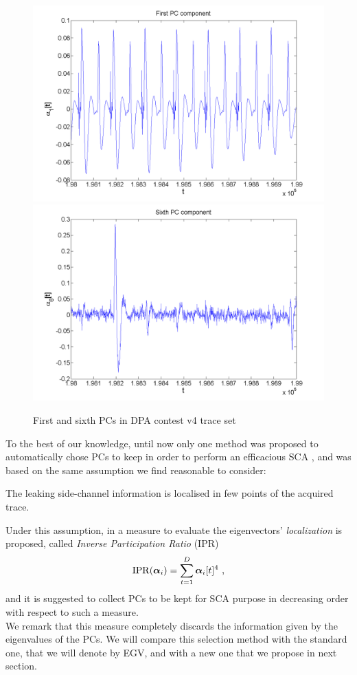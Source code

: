 \begin{figure}
\includegraphics[width=.5\textwidth]{figures/PC_1_10000_198001_199000.png} 
\includegraphics[width=.5\textwidth]{figures/PC_6_10000_198001_199000.png} 
\caption{First and sixth PCs in DPA contest v4 trace set}\label{fig:DPAcontest}
\end{figure}
To the best of our knowledge, until now only one method was proposed to automatically chose PCs to keep in order to perform an efficacious SCA \cite{SCAclassProbl}, and was based on the same assumption we find reasonable to consider:
\begin{assumption}\label{assum:local}
The leaking side-channel information is localised in few points of the acquired trace.
\end{assumption}
Under this assumption, in \cite{SCAclassProbl} a measure to evaluate the eigenvectors' {\em localization} is proposed, called {\em Inverse Participation Ratio} (IPR)
\begin{equation}
\mathrm{IPR}(\boldsymbol\alpha_i) = \sum_{t=1}^D \boldsymbol\alpha_i[t]^4 \mbox{ ,}
\end{equation}
and it is suggested to collect PCs to be kept for SCA purpose in decreasing order with respect to such a measure.\\
We remark that this measure completely discards the information given by the eigenvalues of the PCs. We will compare this selection method with the standard one, that we will denote by EGV, and with a new one that we propose in next section.

%
